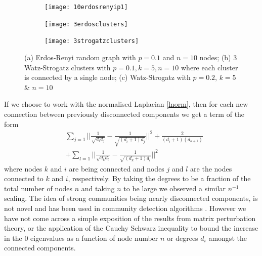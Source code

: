 \documentclass{article}
\begin{document}
\begin{figure}[t]
	\begin{subfigure}{.32\linewidth}
		\centering
		\texttt{[image: 10erdosrenyip1]}
		\caption{}
		\label{fig:sub1}
	\end{subfigure}
	\begin{subfigure}{.32\linewidth}
		\centering
		\texttt{[image: 3erdosclusters]}
		\caption{}
		\label{fig:sub2}
	\end{subfigure}
	\begin{subfigure}{.32\linewidth}
		\centering
		\texttt{[image: 3strogatzclusters]}
		\caption{}
		\label{fig:sub3}
	\end{subfigure}
	\caption{(a) Erdos-Renyi random graph with $p=0.1$ and $n=10$ nodes; (b) 3 Watz-Strogatz clusters with $p=0.1,k=5,n=10$ where each cluster is connected by a single node; (c) Watz-Strogatz with $p=0.2$, $k=5$ \& $n=10$ }
	\label{fig:test}
\end{figure}


If we choose to work with the normalised Laplacian \eqref{lnorm}, then for each new connection between previously disconnected components we get a term of the form
\begin{align}
 & \sum_{j=1}\bigg|\bigg|\frac{1}{\sqrt{d_{i}d_{j}}}-\frac{1}{\sqrt{(d_{i}+1)d_{j}}}\bigg|\bigg|^{2}+\frac{2}{(d_{i}+1)(d_{k+1})} \nonumber \\
 & + \sum_{l=1}\bigg|\bigg|\frac{1}{\sqrt{d_{k}d_{l}}}-\frac{1}{\sqrt{(d_{k}+1)d_{l}}}\bigg|\bigg|^{2}
 \end{align}
where nodes $k$ and $i$ are being connected and nodes $j$ and $l$ are the nodes connected to $k$ and $i$, respectively. By taking the degrees to be a fraction of the total number of nodes $n$ and taking $n$ to be large we observed a similar $n^{-1}$ scaling. The idea of strong communities being nearly disconnected components, is not novel \citep{mcgraw2008laplacian} and has been used in community detection algorithms \citep{capocci2005detecting}. However we have not come across a simple exposition of the results from matrix perturbation theory, or the application of the Cauchy Schwarz inequality to bound the increase in the $0$ eigenvalues as a function of node number $n$ or degrees $d_{i}$ amongst the connected components.


\end{document}
